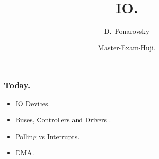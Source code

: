 \documentclass[usenames, aspectratio=169]{beamer}
\title[IO ] %
{IO.}
\subtitle{  }
\author[D.~Ponarovsky] %
	{D.~Ponarovsky\inst{1}}
\institute[HUJI] %
{  Faculty of Computer Science\newline
  Hebrew University of Jerusalem
}
\date[2023] %
{Master-Exam-Huji.}
\newcommand{\pslsq}[4]{
\begin{frame}
    \frametitle{#1} 
    \texttt{[image: ../source/\#3]}
    #4  
  \end{frame}
}
\newcommand{\psls}[4]{
  \begin{frame}
    \frametitle{#1} 
    \begin{columns}[t]
      \begin{column}{.48\textwidth}
        #4
      \end{column}
      \begin{column}{.52\textwidth}
        \adjincludegraphics[width=.98\linewidth, valign=t]{../source/#3}
      \end{column} 
    \end{columns}
  \end{frame}
}
\begin{document}
\begin{frame}
  \maketitle
\end{frame}

\begin{frame}
  \frametitle{ Today. }
  \begin{itemize}
    \item<1-> IO Devices. 
    \item<2-> Buses, Controllers and Drivers . 
    \item<3-> Polling vs Interrupts.
    \item<4-> DMA.  
  \end{itemize} 
\end{frame}



\end{document}
